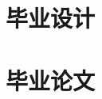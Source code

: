 \cleardoublepage

\tableofcontents

{
  \cleardoublepage
      {\part{毕业设计}}
      {\part{毕业论文}}
}{}